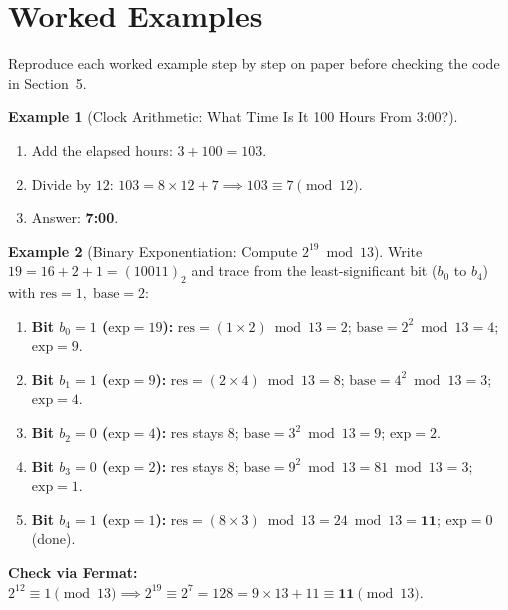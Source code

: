 \documentclass[11pt,a4paper]{article}
\theoremstyle{definition}
\newtheorem{example}{Example}[section]
\begin{document}
\section{Worked Examples}

Reproduce each worked example step by step on paper before checking the code in Section~5.

\begin{example}[Clock Arithmetic: What Time Is It 100 Hours From 3:00?]
\begin{enumerate}
    \item Add the elapsed hours: $3 + 100 = 103$.
    \item Divide by $12$: $103 = 8 \times 12 + 7 \implies 103 \equiv 7 \pmod{12}$.
    \item Answer: \textbf{7:00}.
\end{enumerate}
\end{example}

\begin{example}[Binary Exponentiation: Compute $2^{19} \bmod 13$]
Write $19 = 16 + 2 + 1 = (10011)_2$ and trace from the least-significant bit ($b_0$ to $b_4$) with $\text{res} = 1,\; \text{base} = 2$:
\begin{enumerate}
    \item \textbf{Bit $b_0 = 1$ ($\text{exp} = 19$):} $\text{res} = (1 \times 2) \bmod 13 = 2$;\; $\text{base} = 2^2 \bmod 13 = 4$;\; $\text{exp} = 9$.
    \item \textbf{Bit $b_1 = 1$ ($\text{exp} = 9$):} $\text{res} = (2 \times 4) \bmod 13 = 8$;\; $\text{base} = 4^2 \bmod 13 = 3$;\; $\text{exp} = 4$.
    \item \textbf{Bit $b_2 = 0$ ($\text{exp} = 4$):} $\text{res}$ stays $8$;\; $\text{base} = 3^2 \bmod 13 = 9$;\; $\text{exp} = 2$.
    \item \textbf{Bit $b_3 = 0$ ($\text{exp} = 2$):} $\text{res}$ stays $8$;\; $\text{base} = 9^2 \bmod 13 = 81 \bmod 13 = 3$;\; $\text{exp} = 1$.
    \item \textbf{Bit $b_4 = 1$ ($\text{exp} = 1$):} $\text{res} = (8 \times 3) \bmod 13 = 24 \bmod 13 = \mathbf{11}$;\; $\text{exp} = 0$ (done).
\end{enumerate}
\textbf{Check via Fermat:} $2^{12} \equiv 1 \pmod{13} \implies 2^{19} \equiv 2^7 = 128 = 9 \times 13 + 11 \equiv \mathbf{11} \pmod{13}$.
\end{example}
\end{document}
